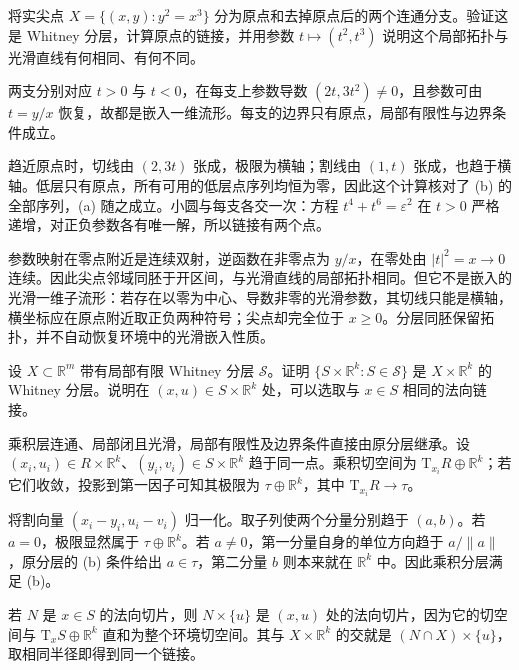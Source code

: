 \BookExercises

\begin{exercise}\label{g2:ex:cusp-whitney-link}
	将实尖点 \(X=\{(x,y):y^2=x^3\}\) 分为原点和去掉原点后的两个连通分支。验证这是 Whitney 分层，计算原点的链接，并用参数 \(t\mapsto(t^2,t^3)\) 说明这个局部拓扑与光滑直线有何相同、有何不同。
\end{exercise}
\begin{solution}
	两支分别对应 \(t>0\) 与 \(t<0\)，在每支上参数导数 \((2t,3t^2)\ne0\)，且参数可由 \(t=y/x\) 恢复，故都是嵌入一维流形。每支的边界只有原点，局部有限性与边界条件成立。

	趋近原点时，切线由 \((2,3t)\) 张成，极限为横轴；割线由 \((1,t)\) 张成，也趋于横轴。低层只有原点，所有可用的低层点序列均恒为零，因此这个计算核对了 (b) 的全部序列，(a) 随之成立。小圆与每支各交一次：方程 \(t^4+t^6=\varepsilon^2\) 在 \(t>0\) 严格递增，对正负参数各有唯一解，所以链接有两个点。

	参数映射在零点附近是连续双射，逆函数在非零点为 \(y/x\)，在零处由 \(|t|^2=x\to0\) 连续。因此尖点邻域同胚于开区间，与光滑直线的局部拓扑相同。但它不是嵌入的光滑一维子流形：若存在以零为中心、导数非零的光滑参数，其切线只能是横轴，横坐标应在原点附近取正负两种符号；尖点却完全位于 \(x\geq0\)。分层同胚保留拓扑，并不自动恢复环境中的光滑嵌入性质。
\end{solution}

\begin{exercise}\label{g2:ex:whitney-product-strata}
	设 \(X\subset\mathbb R^m\) 带有局部有限 Whitney 分层 \(\mathcal S\)。证明 \(\{S\times\mathbb R^k:S\in\mathcal S\}\) 是 \(X\times\mathbb R^k\) 的 Whitney 分层。说明在 \((x,u)\in S\times\mathbb R^k\) 处，可以选取与 \(x\in S\) 相同的法向链接。
\end{exercise}
\begin{solution}
	乘积层连通、局部闭且光滑，局部有限性及边界条件直接由原分层继承。设 \((x_i,u_i)\in R\times\mathbb R^k\)、\((y_i,v_i)\in S\times\mathbb R^k\) 趋于同一点。乘积切空间为 \(\mathrm T_{x_i}R\oplus\mathbb R^k\)；若它们收敛，投影到第一因子可知其极限为 \(\tau\oplus\mathbb R^k\)，其中 \(\mathrm T_{x_i}R\to\tau\)。

	将割向量 \((x_i-y_i,u_i-v_i)\) 归一化。取子列使两个分量分别趋于 \((a,b)\)。若 \(a=0\)，极限显然属于 \(\tau\oplus\mathbb R^k\)。若 \(a\ne0\)，第一分量自身的单位方向趋于 \(a/\lVert a\rVert\)，原分层的 (b) 条件给出 \(a\in\tau\)，第二分量 \(b\) 则本来就在 \(\mathbb R^k\) 中。因此乘积分层满足 (b)。

	若 \(N\) 是 \(x\in S\) 的法向切片，则 \(N\times\{u\}\) 是 \((x,u)\) 处的法向切片，因为它的切空间与 \(\mathrm T_xS\oplus\mathbb R^k\) 直和为整个环境切空间。其与 \(X\times\mathbb R^k\) 的交就是 \((N\cap X)\times\{u\}\)，取相同半径即得到同一个链接。
\end{solution}

